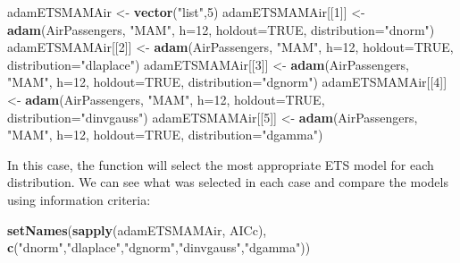 \documentclass[]{book}
\newenvironment{Shaded}{\begin{snugshade}}{\end{snugshade}}
\newcommand{\DataTypeTok}[1]{\textcolor[rgb]{0.13,0.29,0.53}{#1}}
\newcommand{\DecValTok}[1]{\textcolor[rgb]{0.00,0.00,0.81}{#1}}
\newcommand{\KeywordTok}[1]{\textcolor[rgb]{0.13,0.29,0.53}{\textbf{#1}}}
\newcommand{\NormalTok}[1]{#1}
\newcommand{\OtherTok}[1]{\textcolor[rgb]{0.56,0.35,0.01}{#1}}
\newcommand{\StringTok}[1]{\textcolor[rgb]{0.31,0.60,0.02}{#1}}
\theoremstyle{definition}
\theoremstyle{definition}
\theoremstyle{definition}
\theoremstyle{definition}
\theoremstyle{remark}
\begin{document}
\begin{Shaded}
\begin{Highlighting}[]
\NormalTok{adamETSMAMAir <-}\StringTok{ }\KeywordTok{vector}\NormalTok{(}\StringTok{"list"}\NormalTok{,}\DecValTok{5}\NormalTok{)}
\NormalTok{adamETSMAMAir[[}\DecValTok{1}\NormalTok{]] <-}\StringTok{ }\KeywordTok{adam}\NormalTok{(AirPassengers, }\StringTok{"MAM"}\NormalTok{, }\DataTypeTok{h=}\DecValTok{12}\NormalTok{, }\DataTypeTok{holdout=}\OtherTok{TRUE}\NormalTok{,}
                           \DataTypeTok{distribution=}\StringTok{"dnorm"}\NormalTok{)}
\NormalTok{adamETSMAMAir[[}\DecValTok{2}\NormalTok{]] <-}\StringTok{ }\KeywordTok{adam}\NormalTok{(AirPassengers, }\StringTok{"MAM"}\NormalTok{, }\DataTypeTok{h=}\DecValTok{12}\NormalTok{, }\DataTypeTok{holdout=}\OtherTok{TRUE}\NormalTok{,}
                           \DataTypeTok{distribution=}\StringTok{"dlaplace"}\NormalTok{)}
\NormalTok{adamETSMAMAir[[}\DecValTok{3}\NormalTok{]] <-}\StringTok{ }\KeywordTok{adam}\NormalTok{(AirPassengers, }\StringTok{"MAM"}\NormalTok{, }\DataTypeTok{h=}\DecValTok{12}\NormalTok{, }\DataTypeTok{holdout=}\OtherTok{TRUE}\NormalTok{,}
                           \DataTypeTok{distribution=}\StringTok{"dgnorm"}\NormalTok{)}
\NormalTok{adamETSMAMAir[[}\DecValTok{4}\NormalTok{]] <-}\StringTok{ }\KeywordTok{adam}\NormalTok{(AirPassengers, }\StringTok{"MAM"}\NormalTok{, }\DataTypeTok{h=}\DecValTok{12}\NormalTok{, }\DataTypeTok{holdout=}\OtherTok{TRUE}\NormalTok{,}
                           \DataTypeTok{distribution=}\StringTok{"dinvgauss"}\NormalTok{)}
\NormalTok{adamETSMAMAir[[}\DecValTok{5}\NormalTok{]] <-}\StringTok{ }\KeywordTok{adam}\NormalTok{(AirPassengers, }\StringTok{"MAM"}\NormalTok{, }\DataTypeTok{h=}\DecValTok{12}\NormalTok{, }\DataTypeTok{holdout=}\OtherTok{TRUE}\NormalTok{,}
                           \DataTypeTok{distribution=}\StringTok{"dgamma"}\NormalTok{)}
\end{Highlighting}
\end{Shaded}

In this case, the function will select the most appropriate ETS model for each distribution. We can see what was selected in each case and compare the models using information criteria:

\begin{Shaded}
\begin{Highlighting}[]
\KeywordTok{setNames}\NormalTok{(}\KeywordTok{sapply}\NormalTok{(adamETSMAMAir, AICc),}
         \KeywordTok{c}\NormalTok{(}\StringTok{"dnorm"}\NormalTok{,}\StringTok{"dlaplace"}\NormalTok{,}\StringTok{"dgnorm"}\NormalTok{,}\StringTok{"dinvgauss"}\NormalTok{,}\StringTok{"dgamma"}\NormalTok{))}
\end{Highlighting}
\end{Shaded}
\end{document}

